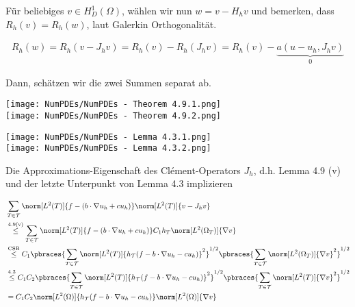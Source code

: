 \begin{solution}
\begin{enumerate}[label = \textbf{\alph*)}]
  Für beliebiges $v \in H_D^1(\Omega)$, wählen wir nun $w = v - H_h v$ und bemerken, dass $R_h(v) = R_h(w)$, laut Galerkin Orthogonalität.

  \begin{align*}
    R_h(w)
    =
    R_h(v - J_h v)
    =
    R_h(v) - R_h(J_h v)
    =
    R_h(v) - \underbrace{a(u - u_h, J_h v)}_0
  \end{align*}

  Dann, schätzen wir die zwei Summen separat ab.

  \begin{tcolorbox}[standard jigsaw, opacityback = 0]
    \centering
    \texttt{[image: NumPDEs/NumPDEs - Theorem 4.9.1.png]} \\
    \texttt{[image: NumPDEs/NumPDEs - Theorem 4.9.2.png]}
  \end{tcolorbox}

  \begin{tcolorbox}[standard jigsaw, opacityback = 0]
    \centering
    \texttt{[image: NumPDEs/NumPDEs - Lemma 4.3.1.png]} \\
    \texttt{[image: NumPDEs/NumPDEs - Lemma 4.3.2.png]}
  \end{tcolorbox}

  Die Approximations-Eigenschaft des Clément-Operators $J_h$, d.h. Lemma 4.9 (v) und der letzte Unterpunkt von Lemma 4.3 implizieren

  \begin{align*}
    & \sum_{T \in \mathcal{T}}
    \norm[L^2(T)]{f - (b \cdot \nabla u_h + c u_h)}
    \norm[L^2(T)]{v - J_h v} \\
    & \stackrel
    {
      \mathrm{4.9 (v)}
    }{\leq}
    \sum_{T \in \mathcal{T}}
    \norm[L^2(T)]{f - (b \cdot \nabla u_h + c u_h)}
    C_1 h_T
    \norm[L^2(\Omega_T)]{\nabla v} \\
    & \stackrel
    {
      \mathrm{CSB}
    }{\leq}
    C_1
    \pbraces
    {
      \sum_{T \in \mathcal{T}}
      \norm[L^2(T)]{h_\mathcal{T} (f - b \cdot \nabla u_h - c u_h)}^2
    }^{1/2}
    \pbraces
    {
      \sum_{T \in \mathcal{T}}
      \norm[L^2(\Omega_T)]{\nabla v}^2
    }^{1/2} \\
    & \stackrel
    {
      \mathrm{4.3}
    }{\leq}
    C_1 C_2
    \pbraces
    {
      \sum_{T \in \mathcal{T}}
      \norm[L^2(T)]{h_\mathcal{T} (f - b \cdot \nabla u_h - c u_h)}^2
    }^{1/2}
    \pbraces
    {
      \sum_{T \in \mathcal{T}}
      \norm[L^2(T)]{\nabla v}^2
    }^{1/2} \\
    & =
    C_1 C_2
    \norm[L^2(\Omega)]{h_\mathcal{T} (f - b \cdot \nabla u_h - c u_h)}
    \norm[L^2(\Omega)]{\nabla v}
  \end{align*}


\end{enumerate}
\end{solution}
